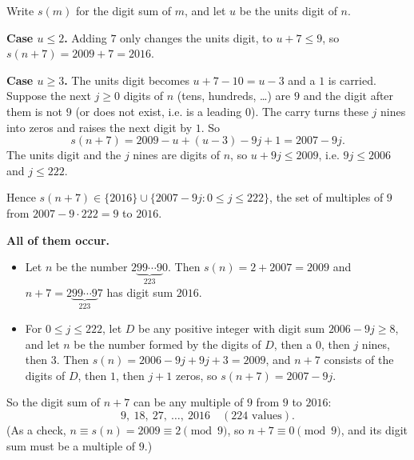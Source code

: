 Write $s(m)$ for the digit sum of $m$, and let $u$ be the units digit of $n$.

\textbf{Case $u\le2$.} Adding $7$ only changes the units digit, to $u+7\le9$, so $s(n+7)=2009+7=2016$.

\textbf{Case $u\ge3$.} The units digit becomes $u+7-10=u-3$ and a $1$ is carried. Suppose the next $j\ge0$ digits of $n$ (tens, hundreds, \dots) are $9$ and the digit after them is not $9$ (or does not exist, i.e. is a leading $0$). The carry turns these $j$ nines into zeros and raises the next digit by $1$. So
\[s(n+7)=2009-u+(u-3)-9j+1=2007-9j.\]
The units digit and the $j$ nines are digits of $n$, so $u+9j\le2009$, i.e. $9j\le2006$ and $j\le222$.

Hence $s(n+7)\in\{2016\}\cup\{2007-9j:0\le j\le222\}$, the set of multiples of $9$ from $2007-9\cdot222=9$ to $2016$.

\textbf{All of them occur.}
\begin{itemize}
\item Let $n$ be the number $2\underbrace{99\cdots9}_{223}0$. Then $s(n)=2+2007=2009$ and $n+7=2\underbrace{99\cdots9}_{223}7$ has digit sum $2016$.
\item For $0\le j\le222$, let $D$ be any positive integer with digit sum $2006-9j\ge8$, and let $n$ be the number formed by the digits of $D$, then a $0$, then $j$ nines, then $3$. Then $s(n)=2006-9j+9j+3=2009$, and $n+7$ consists of the digits of $D$, then $1$, then $j+1$ zeros, so $s(n+7)=2007-9j$.
\end{itemize}

So the digit sum of $n+7$ can be any multiple of $9$ from $9$ to $2016$:
\[\boxed{9,\ 18,\ 27,\ \dots,\ 2016}\quad(224\text{ values}).\]
(As a check, $n\equiv s(n)=2009\equiv2\pmod9$, so $n+7\equiv0\pmod9$, and its digit sum must be a multiple of $9$.)
